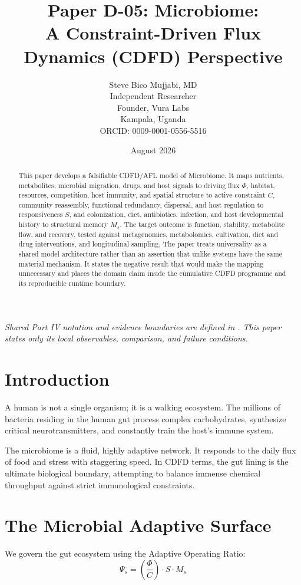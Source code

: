 \documentclass[11pt,a4paper]{article}
\title{\textbf{Paper D-05: Microbiome:\\ A Constraint-Driven Flux Dynamics (CDFD) Perspective}}
\author{Steve Bico Mujjabi, MD\\
\small Independent Researcher\\
\small Founder, Vura Labs\\
\small Kampala, Uganda\\
\small ORCID: 0009-0001-0556-5516}
\date{August 2026}
\begin{document}
\maketitle

\noindent\textit{Shared Part IV notation and evidence boundaries are defined in . This paper states only its local observables, comparison, and failure conditions.}


\begin{abstract}
This paper develops a falsifiable CDFD/AFL model of Microbiome. It maps nutrients, metabolites, microbial migration, drugs, and host signals to driving flux $\Phi$, habitat, resources, competition, host immunity, and spatial structure to active constraint $C$, community reassembly, functional redundancy, dispersal, and host regulation to responsiveness $S$, and colonization, diet, antibiotics, infection, and host developmental history to structural memory $M_s$. The target outcome is function, stability, metabolite flow, and recovery, tested against metagenomics, metabolomics, cultivation, diet and drug interventions, and longitudinal sampling. The paper treats universality as a shared model architecture rather than an assertion that unlike systems have the same material mechanism. It states the negative result that would make the mapping unnecessary and places the domain claim inside the cumulative CDFD programme and its reproducible runtime boundary.
\end{abstract}

\section{Introduction}

A human is not a single organism; it is a walking ecosystem. The millions of bacteria residing in the human gut process complex carbohydrates, synthesize critical neurotransmitters, and constantly train the host's immune system.

The microbiome is a fluid, highly adaptive network. It responds to the daily flux of food and stress with staggering speed. In CDFD terms, the gut lining is the ultimate biological boundary, attempting to balance immense chemical throughput against strict immunological constraints.

\section{The Microbial Adaptive Surface}
We govern the gut ecosystem using the Adaptive Operating Ratio:
\begin{equation}
    \Psi_s = \left( \frac{\Phi}{C} \right) \cdot S \cdot M_s
\end{equation}
\end{document}
